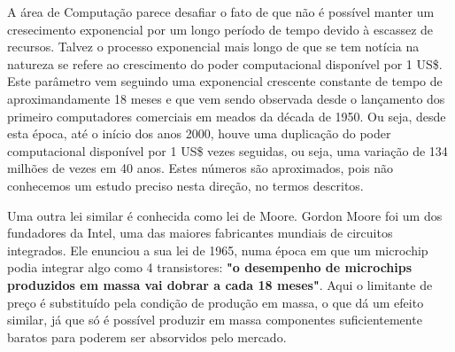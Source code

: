 A área de Computação parece desafiar o fato de que não é possível manter um cresecimento exponencial por um longo período de tempo devido à escassez de recursos. Talvez o processo exponencial mais longo de que se tem notícia na natureza se refere ao crescimento do poder computacional disponível por 1 US\$. Este parâmetro vem seguindo uma exponencial crescente constante de tempo de aproximandamente 18 meses e que vem sendo observada desde o lançamento dos primeiro computadores comerciais em meados da década de 1950. Ou seja, desde esta época, até o início dos anos 2000, houve uma duplicação do poder computacional disponível por 1 US\$ vezes seguidas, ou seja, uma variação de 134 milhões de vezes em 40 anos. Estes números são aproximados, pois não conhecemos um estudo preciso nesta direção, no termos descritos.

Uma outra lei similar é conhecida como lei de Moore. Gordon Moore foi um dos fundadores da Intel, uma das maiores fabricantes mundiais de circuitos integrados. Ele enunciou a sua lei de 1965, numa época em que um microchip podia integrar algo como 4 transistores: \textbf{"o desempenho de microchips produzidos em massa vai dobrar a cada 18 meses"}. Aqui o limitante de preço é substituído pela condição de produção em massa, o que dá um efeito similar, já que só é possível produzir em massa componentes suficientemente baratos para poderem ser absorvidos pelo mercado.



